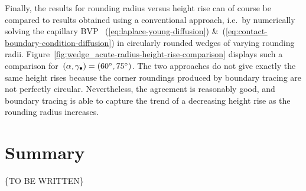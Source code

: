 \begin{figure}
\end{figure}

Finally, the results for rounding radius versus height rise
can of course be compared
to results obtained using a conventional approach,
i.e.~by numerically solving the capillary BVP~%
  (\ref{eq:laplace-young-diffusion})
\&~(\ref{eq:contact-boundary-condition-diffusion})
in circularly rounded wedges of varying rounding radii.
Figure~\ref{fig:wedge_acute-radius-height-rise-comparison}
displays such a comparison
for~$(\alpha, \gamma_\bullet) = (\SI{60}{\degree}, \SI{75}{\degree})$.
The two approaches do not give exactly the same height rises
because the corner roundings produced by boundary tracing
are not perfectly circular.
Nevertheless, the agreement is reasonably good,
and boundary tracing is able to capture
the trend of a decreasing height rise as the rounding radius increases.

\section{Summary}
\label{sec:moderate.summary}

\{TO BE WRITTEN\}
